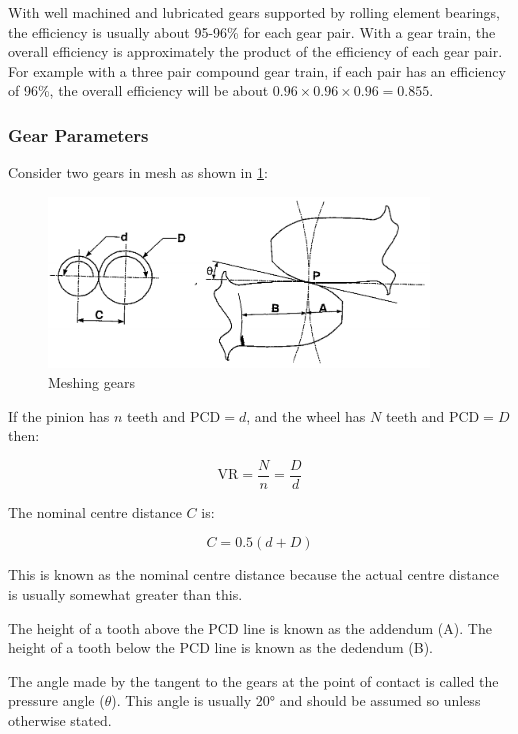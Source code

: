 With well machined and lubricated gears supported by rolling element bearings, the efficiency is usually about 95-96\% for each gear pair. With a gear train, the overall efficiency is approximately the product of the efficiency of each gear pair. For example with a three pair compound gear train, if each pair has an efficiency of 96\%, the overall efficiency will be about $0.96\times0.96\times0.96=0.855$.

\subsubsection{Gear Parameters}

Consider two gears in mesh as shown in \cref{fig-3}:

\begin{figure}[h!]
  \center
  \includegraphics[width=0.9\textwidth]{figs/meshing-gears.png}
  \caption{Meshing gears}
  \label{fig-3}
\end{figure}

If the pinion has $n$ teeth and $\text{PCD}=d$, and the wheel has $N$ teeth and $\text{PCD}=D$ then:

\begin{equation}
  \text{VR} = \frac{N}{n} = \frac{D}{d}
\end{equation}

The nominal centre distance $C$ is:

\begin{equation}
  C = 0.5(d+D)
\end{equation}

This is known as the nominal centre distance because the actual centre distance is usually somewhat greater than this.

The height of a tooth above the PCD line is known as the addendum (A). The height of a tooth below the PCD line is known as the dedendum (B).

The angle made by the tangent to the gears at the point of contact is called the pressure angle ($\theta$). This angle is usually \ang{20} and should be assumed so unless otherwise stated.

